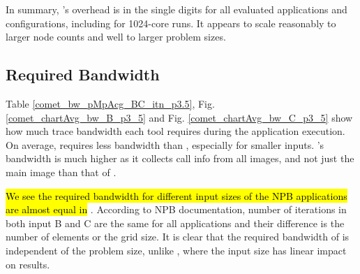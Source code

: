 In summary, \parlot 's overhead is in the single digits for all evaluated applications and configurations, including for 1024-core runs. It appears to scale reasonably to larger node counts and well to larger problem sizes.
  
\subsection{Required Bandwidth}
\label{subsec:lowbw}



Table \ref{comet_bw_pMpAcg_BC_itn_p3.5}, Fig.  \ref{comet_chartAvg_bw_B_p3_5} and Fig. \ref{comet_chartAvg_bw_C_p3_5} show how much trace bandwidth each tool 
requires
during the application execution. 
%
On average, \parlotm requires less bandwidth than
\callgrind, especially for smaller inputs. 
%
\parlota's bandwidth is much higher as it collects call info from all
images, and not just the main image than that of \parlotm.



\hl{We see the required bandwidth for different input sizes of the NPB applications are almost equal in }\parlot. According to NPB documentation, number of iterations in both input B and C are the same for all applications and their difference is the number of elements or the grid size. It is clear that the required bandwidth of \parlot is independent of the problem size, unlike \callgrind, where the input size has linear impact on results.
%








  
